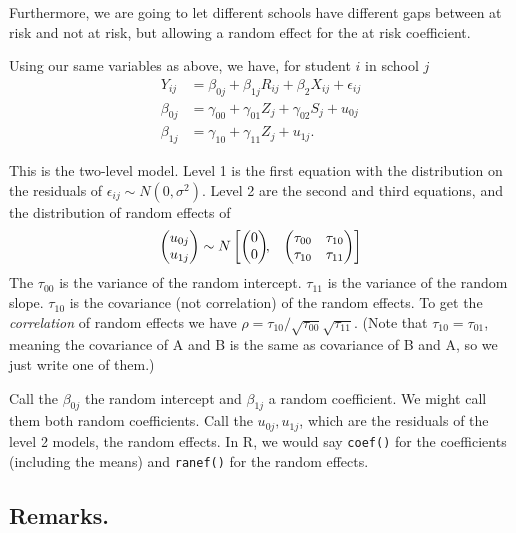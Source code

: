 \documentclass[
  letterpaper,
  DIV=11,
  numbers=noendperiod]{scrreprt}
\begin{document}
Furthermore, we are going to let different schools have different gaps
between at risk and not at risk, but allowing a random effect for the at
risk coefficient.

Using our same variables as above, we have, for student \(i\) in school
\(j\) \[\begin{aligned}
Y_{ij} &= \beta_{0j} + \beta_{1j} R_{ij} + \beta_{2} X_{ij} + \epsilon_{ij} \\
\beta_{0j} &= \gamma_{00} + \gamma_{01} Z_{j} + \gamma_{02} S_{j} + u_{0j} \\
\beta_{1j} &= \gamma_{10} + \gamma_{11} Z_{j} + u_{1j} .
\end{aligned}\]

This is the two-level model. Level 1 is the first equation with the
distribution on the residuals of
\(\epsilon_{ij} \sim N( 0, \sigma^2 )\). Level 2 are the second and
third equations, and the distribution of random effects of
\[\begin{pmatrix} u_{0j} \\
u_{1j}
\end{pmatrix} \sim  N
\begin{bmatrix}
\begin{pmatrix}
0 \\
0
\end{pmatrix}\!\!,&
\begin{pmatrix}
\tau_{00} & \tau_{10} \\
\tau_{10} & \tau_{11} \\
\end{pmatrix}
\end{bmatrix}\\[2\jot]\] The \(\tau_{00}\) is the variance of the random
intercept. \(\tau_{11}\) is the variance of the random slope.
\(\tau_{10}\) is the covariance (not correlation) of the random effects.
To get the \emph{correlation} of random effects we have
\(\rho = \tau_{10} / \sqrt{ \tau_{00} } \sqrt{ \tau_{11} }\). (Note that
\(\tau_{10} = \tau_{01}\), meaning the covariance of A and B is the same
as covariance of B and A, so we just write one of them.)

Call the \(\beta_{0j}\) the random intercept and \(\beta_{1j}\) a random
coefficient. We might call them both random coefficients. Call the
\(u_{0j}, u_{1j}\), which are the residuals of the level 2 models, the
random effects. In R, we would say \texttt{coef()} for the coefficients
(including the means) and \texttt{ranef()} for the random effects.

\hypertarget{remarks.-2}{%
\subsection{Remarks.}\label{remarks.-2}}
\end{document}
